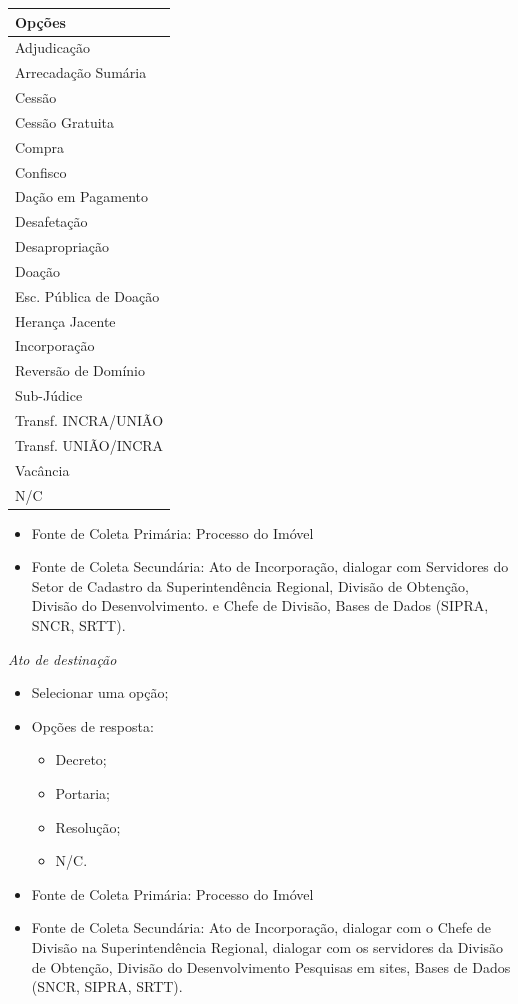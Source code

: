 \documentclass[
  letterpaper,
]{report}
\providecommand{\tightlist}{%
  \setlength{\itemsep}{0pt}\setlength{\parskip}{0pt}}\usepackage{longtable,booktabs,array}
\begin{document}
\begin{longtable}[]{@{}l@{}}
\toprule()
Opções \\
\midrule()
\endhead
Adjudicação \\
Arrecadação Sumária \\
Cessão \\
Cessão Gratuita \\
Compra \\
Confisco \\
Dação em Pagamento \\
Desafetação \\
Desapropriação \\
Doação \\
Esc. Pública de Doação \\
Herança Jacente \\
Incorporação \\
Reversão de Domínio \\
Sub-Júdice \\
Transf. INCRA/UNIÃO \\
Transf. UNIÃO/INCRA \\
Vacância \\
N/C \\
\bottomrule()
\end{longtable}

\begin{itemize}
\tightlist
\item
  Fonte de Coleta Primária: Processo do Imóvel
\item
  Fonte de Coleta Secundária: Ato de Incorporação, dialogar com
  Servidores do Setor de Cadastro da Superintendência Regional, Divisão
  de Obtenção, Divisão do Desenvolvimento. e Chefe de Divisão, Bases de
  Dados (SIPRA, SNCR, SRTT).
\end{itemize}

\emph{Ato de destinação}

\begin{itemize}
\tightlist
\item
  Selecionar uma opção;
\item
  Opções de resposta:

  \begin{itemize}
  \tightlist
  \item
    Decreto;
  \item
    Portaria;
  \item
    Resolução;
  \item
    N/C.
  \end{itemize}
\item
  Fonte de Coleta Primária: Processo do Imóvel
\item
  Fonte de Coleta Secundária: Ato de Incorporação, dialogar com o Chefe
  de Divisão na Superintendência Regional, dialogar com os servidores da
  Divisão de Obtenção, Divisão do Desenvolvimento Pesquisas em sites,
  Bases de Dados (SNCR, SIPRA, SRTT).
\end{itemize}
\end{document}
